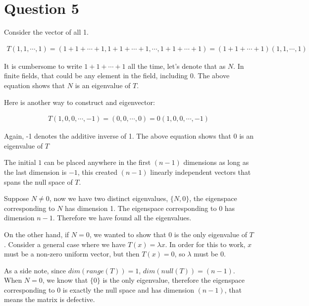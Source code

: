 \section*{Question 5}
Consider the vector of all 1.

\begin{eqnarray*}
T(1,1,\cdots,1) = (1+1+\cdots+1,1+1+\cdots+1,\cdots,1+1+\cdots+1) = (1+1+\cdots+1)(1,1,\cdots,1)
\end{eqnarray*}

It is cumbersome to write $ 1+1+\cdots+1 $ all the time, let's denote that as $ N $. In finite fields, that could be any element in the field, including $ 0 $. The above equation shows that $ N $ is an eigenvalue of $ T $.

Here is another way to construct and eigenvector:

\begin{eqnarray*}
T(1,0,0,\cdots,-1) = (0,0,\cdots,0) = 0(1,0,0,\cdots,-1)
\end{eqnarray*}

Again, -1 denotes the additive inverse of 1. The above equation shows that $ 0 $ is an eigenvalue of $ T $

The initial $ 1 $ can be placed anywhere in the first $ (n-1) $ dimensions as long as the last dimension is $ -1 $, this created $ (n-1) $ linearly independent vectors that spans the null space of $ T $.

Suppose $ N \ne 0 $, now we have two distinct eigenvalues, $ \{ N, 0 \} $, the eigenspace corresponding to $ N $ has dimension 1. The eigenspace corresponding to $ 0 $ has dimension $ n - 1 $. Therefore we have found all the eigenvalues.

On the other hand, if $ N = 0 $, we wanted to show that 0 is the only eigenvalue of $ T $. Consider a general case where we have $ T(x) = \lambda x $. In order for this to work, $ x $ must be a non-zero uniform vector, but then $ T(x) = 0 $, so $ \lambda $ must be 0.

As a side note, since $ dim(range(T)) = 1 $, $ dim(null(T)) = (n-1) $. When $ N = 0$, we know that $ \{0\} $ is the only eigenvalue, therefore the eigenspace corresponding to $ 0 $ is exactly the null space and has dimension $ (n - 1) $, that means the matrix is defective.